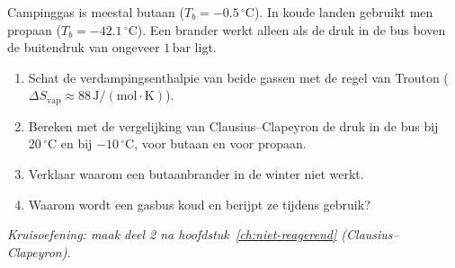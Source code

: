 \begin{oefening}
Campinggas is meestal butaan (\(T_b = -0.5\,^\circ\mathrm{C}\)). In koude landen gebruikt men propaan (\(T_b = -42.1\,^\circ\mathrm{C}\)). Een brander werkt alleen als de druk in de bus boven de buitendruk van ongeveer \(1\,\mathrm{bar}\) ligt.

\begin{enumerate}
\item[(a)]
  Schat de verdampingsenthalpie van beide gassen met de regel van Trouton (\(\Delta S_{\text{vap}} \approx 88\,\mathrm{J/(mol\cdot K)}\)).
\item[(b)]
  Bereken met de vergelijking van Clausius--Clapeyron de druk in de bus bij \(20\,^\circ\mathrm{C}\) en bij \(-10\,^\circ\mathrm{C}\), voor butaan en voor propaan.
\item[(c)]
  Verklaar waarom een butaanbrander in de winter niet werkt.
\item[(d)]
  Waarom wordt een gasbus koud en berijpt ze tijdens gebruik?
\end{enumerate}

\emph{Kruisoefening: maak deel 2 na hoofdstuk~\ref{ch:niet-reagerend} (Clausius--Clapeyron).}
\end{oefening}
